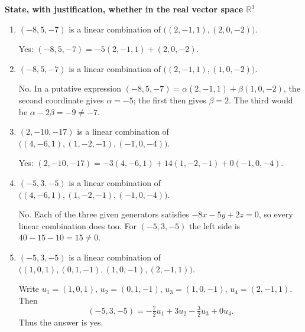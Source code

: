 \providecommand{\rank}{\operatorname{r}}
\providecommand{\RR}{\mathbb R}
\providecommand{\CC}{\mathbb C}
\providecommand{\KK}{\mathbb K}

\setcounter{enumi}{65}
\item {\bfseries\boldmath
State, with justification, whether in the real vector space $\RR^3$
}

\begin{enumerate}[label=\alph*)]

\item $(-8,5,-7)$ is a linear combination of $\bigl((2,-1,1),(2,0,-2)\bigr)$.

\begin{answer}
Yes:
$(-8,5,-7)=-5(2,-1,1)+(2,0,-2)$.
\end{answer}

\item $(-8,5,-7)$ is a linear combination of $\bigl((2,-1,1),(1,0,-2)\bigr)$.

\begin{answer}
No. In a putative expression
$(-8,5,-7)=\alpha(2,-1,1)+\beta(1,0,-2)$, the second coordinate gives
$\alpha=-5$; the first then gives $\beta=2$. The third would be
$\alpha-2\beta=-9\ne-7$.
\end{answer}

\item $ (2,-10,-17)$ is a linear combination of $\bigl((4,-6,1),(1,-2,-1),(-1,0,-4)\bigr)$.

\begin{answer}
Yes:
$ (2,-10,-17)=-3(4,-6,1)+14(1,-2,-1)+0(-1,0,-4)$.
\end{answer}

\item $(-5,3,-5)$ is a linear combination of $\bigl((4,-6,1),(1,-2,-1),(-1,0,-4)\bigr)$.

\begin{answer}
No. Each of the three given generators satisfies
$-8x-5y+2z=0$, so every linear combination does too.
For $(-5,3,-5)$ the left side is $40-15-10=15\ne0$.
\end{answer}

\item $(-5,3,-5)$ is a linear combination of $\bigl((1,0,1),(0,1,-1),(1,0,-1),(2,-1,1)\bigr)$.

\begin{answer}
Write $u_1=(1,0,1)$, $u_2=(0,1,-1)$, $u_3=(1,0,-1)$,
$u_4=(2,-1,1)$. Then
\[
 (-5,3,-5)=-\tfrac72u_1+3u_2-\tfrac32u_3+0u_4.
\]
Thus the answer is yes.
\end{answer}


\end{enumerate}
